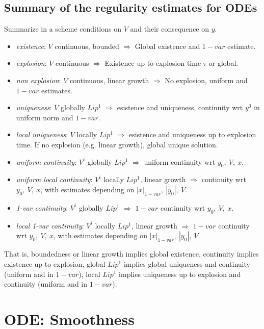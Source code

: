 \documentclass{article}
\begin{document}
\subsection{Summary of the regularity estimates for ODEs}
Summarize in a scheme conditions on $V$ and their consequence on $y.$

\begin{itemize}
    \item \textit{existence}: $V$ continuous, bounded $\Rightarrow$ Global existence and $1-var$ estimate.
    \item \textit{explosion}: $V$ continuous $\Rightarrow$ Existence up to explosion time $\tau$ or global.
    \item \textit{non explosion}: $V$ continuous, linear growth $\Rightarrow$ No explosion, uniform and $1-var$ estimates.
    \item \textit{uniqueness}: $V$ globally $Lip^1$ $\Rightarrow$ esistence and uniqueness, continuity wrt $y^0$ in uniform norm and $1-var.$
    \item \textit{local uniqueness}: $V$ locally $Lip^1$ $\Rightarrow$ esistence and uniqueness up to explosion time. If no explosion (e.g. linear growth), global unique solution.
    \item \textit{uniform continuity}: $V^i$ globally $Lip^1$ $\Rightarrow$ uniform continuity wrt $y_0,\ V,\ x$.
    \item \textit{uniform local continuity}: $V^i$ locally $Lip^1$, linear growth $\Rightarrow$ continuity wrt $y_0,\ V,\ x$, with estimates depending on $|x|_{1-var},\ |y_0|,\ V.$
    \item \textit{1-var continuity}: $V^i$ globally $Lip^1$ $\Rightarrow$ $1-var$ continuity wrt $y_0,\ V,\ x$.
    \item \textit{local 1-var continuity}: $V^i$ locally $Lip^1$, linear growth $\Rightarrow$ $1-var$ continuity wrt $y_0,\ V,\ x$, with estimates depending on $|x|_{1-var},\ |y_0|,\ V.$
\end{itemize}

That is, boundedness or linear growth implies global existence, continuity implies existence up to explosion, global $Lip^1$ implies global uniqueness and continuity (uniform and in $1-var$), local $Lip^1$ implies uniqueness up to explosion and continuity (uniform and in $1-var$).
\section{ODE: Smoothness}
\end{document}
